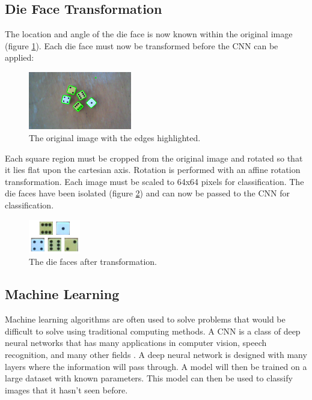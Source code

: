 \documentclass[conference]{IEEEtran}
\begin{document}
\subsection{Die Face Transformation}

The location and angle of the die face is now known within the original image (figure \ref{fig:canny}).
Each die face must now be transformed before the CNN can be applied:
\begin{figure}
	\centering
	\includegraphics[width=0.4\textwidth]{canny}
	\caption{The original image with the edges highlighted.}
	\label{fig:canny}
\end{figure}

Each square region must be cropped from the original image and rotated so that it lies flat upon the cartesian axis.
Rotation is performed with an affine rotation transformation.
Each image must be scaled to 64x64 pixels for classification.
The die faces have been isolated (figure \ref{fig:faces}) and can now be passed to the CNN for classification.
\begin{figure}
	\centering
	\includegraphics[width=0.2\textwidth]{faces}
	\caption{The die faces after transformation.}
	\label{fig:faces}
\end{figure}

\subsection{Machine Learning}

Machine learning algorithms are often used to solve problems that would be difficult to solve using traditional computing methods.
A CNN is a class of deep neural networks that has many applications in computer vision, speech recognition, and many other fields \cite{Pena2014}\cite{Madabhushi2016}\cite{Lawrence1997}\cite{Kalchbrenner2014}.
A deep neural network is designed with many layers where the information will pass through.
A model will then be trained on a large dataset with known parameters.
This model can then be used to classify images that it hasn't seen before.
\end{document}
